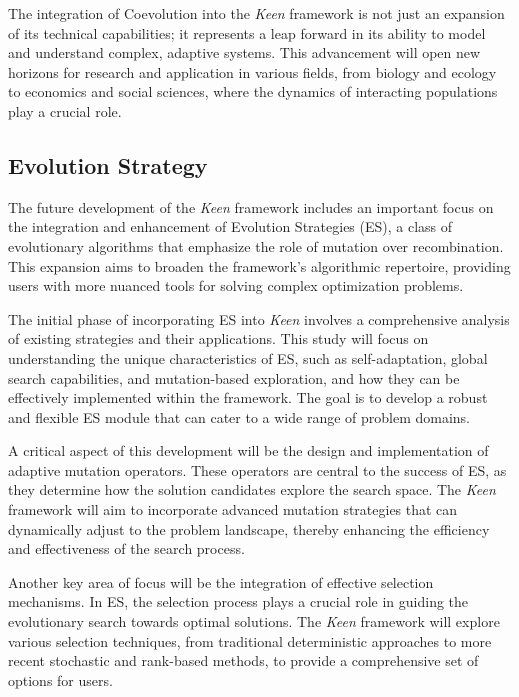             The integration of Coevolution into the \textit{Keen} framework is not just an expansion of its technical 
            capabilities; it represents a leap forward in its ability to model and understand complex, adaptive systems. 
            This advancement will open new horizons for research and application in various fields, from biology and 
            ecology to economics and social sciences, where the dynamics of interacting populations play a crucial role.

    \subsection{Evolution Strategy}
    \label{sec:future:es}
        The future development of the \textit{Keen} framework includes an important focus on the integration and 
        enhancement of Evolution Strategies (ES), a class of evolutionary algorithms that emphasize the role of mutation 
        over recombination. This expansion aims to broaden the framework's algorithmic repertoire, providing users with 
        more nuanced tools for solving complex optimization problems.

        The initial phase of incorporating ES into \textit{Keen} involves a comprehensive analysis of existing 
        strategies and their applications. This study will focus on understanding the unique characteristics of ES, such 
        as self-adaptation, global search capabilities, and mutation-based exploration, and how they can be effectively 
        implemented within the framework. The goal is to develop a robust and flexible ES module that can cater to a 
        wide range of problem domains.

        A critical aspect of this development will be the design and implementation of adaptive mutation operators. 
        These operators are central to the success of ES, as they determine how the solution candidates explore the 
        search space. The \textit{Keen} framework will aim to incorporate advanced mutation strategies that can 
        dynamically adjust to the problem landscape, thereby enhancing the efficiency and effectiveness of the search 
        process.

        Another key area of focus will be the integration of effective selection mechanisms. In ES, the selection 
        process plays a crucial role in guiding the evolutionary search towards optimal solutions. The \textit{Keen} 
        framework will explore various selection techniques, from traditional deterministic approaches to more recent 
        stochastic and rank-based methods, to provide a comprehensive set of options for users.

